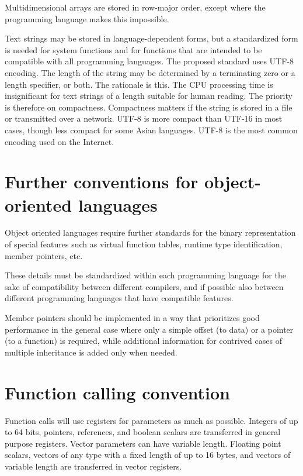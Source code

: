 \documentclass[forwardcom.tex]{subfiles}
\begin{document}
Multidimensional arrays are stored in row-major order, except where the programming language makes this impossible. 
\vspace{2mm}

Text strings may be stored in language-dependent forms, but a standardized form is needed for system functions and for functions that are intended to be compatible with all programming languages. The proposed standard uses UTF-8 encoding. The length of the string may be determined by a terminating zero or a length specifier, or both.
The rationale is this. The CPU processing time is insignificant for text strings of a length suitable for human reading. The priority is therefore on compactness. Compactness matters if the string is stored in a file or transmitted over a network. UTF-8 is more compact than UTF-16 in most cases, though less compact for some Asian languages. UTF-8 is the most common encoding used on the Internet.

\section{Further conventions for object-oriented languages}
Object oriented languages require further standards for the binary representation of special features such as virtual function tables, runtime type identification, member pointers, etc. 
\vspace{2mm}

These details must be standardized within each programming language for the sake of compatibility between different compilers, and if possible also between different programming languages that have compatible features. 
\vspace{2mm}

Member pointers should be implemented in a way that prioritizes good performance in the general case where only a simple offset (to data) or a pointer (to a function) is required, while additional information for contrived cases of multiple inheritance is added only when needed. 

\section{Function calling convention} \label{functionCallingConventions}
Function calls will use registers for parameters as much as possible. Integers of up to 64 bits, pointers, references, and boolean scalars are transferred in general purpose registers. Vector parameters can have variable length. Floating point scalars, vectors of any type with a fixed length of up to 16 bytes, and vectors of variable length are transferred in vector registers. 
\vspace{2mm}
\end{document}
